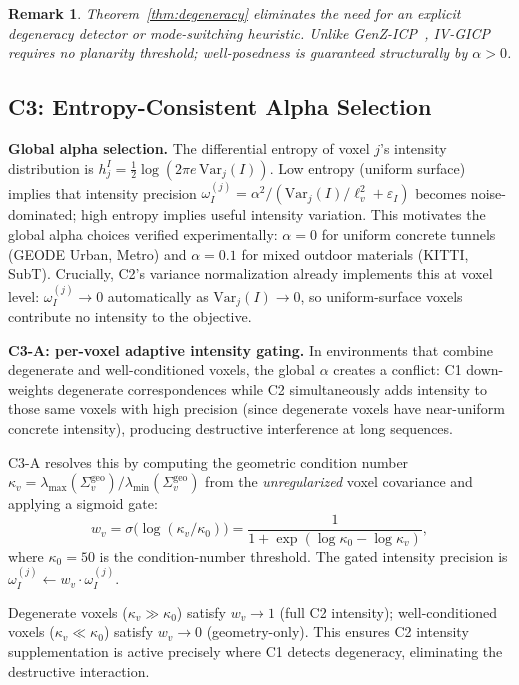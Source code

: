 \documentclass[letterpaper, 10pt, conference]{ieeeconf}
\newtheorem{remark}{Remark}
\begin{document}
\begin{remark}
Theorem~\ref{thm:degeneracy} eliminates the need for an explicit degeneracy
detector or mode-switching heuristic.
Unlike GenZ-ICP~\cite{zhang2024genz}, IV-GICP requires no planarity threshold;
well-posedness is guaranteed structurally by $\alpha > 0$.
\end{remark}

\subsection{C3: Entropy-Consistent Alpha Selection}\label{sec:c3}

\textbf{Global alpha selection.}
The differential entropy of voxel $j$'s intensity distribution is
$h_j^I = \frac{1}{2}\log(2\pi e\,\mathrm{Var}_j(I))$.
Low entropy (uniform surface) implies that intensity precision
$\omega_I^{(j)} = \alpha^2/(\mathrm{Var}_j(I)/\ell_v^2 + \varepsilon_I)$ becomes
noise-dominated; high entropy implies useful intensity variation.
This motivates the global alpha choices verified experimentally:
$\alpha = 0$ for uniform concrete tunnels (GEODE Urban, Metro) and $\alpha = 0.1$
for mixed outdoor materials (KITTI, SubT).
Crucially, C2's variance normalization already implements this at voxel level:
$\omega_I^{(j)} \to 0$ automatically as $\mathrm{Var}_j(I) \to 0$,
so uniform-surface voxels contribute no intensity to the objective.

\textbf{C3-A: per-voxel adaptive intensity gating.}
In environments that combine degenerate and well-conditioned voxels, the
global $\alpha$ creates a conflict: C1 down-weights degenerate correspondences
while C2 simultaneously adds intensity to those same voxels with high precision
(since degenerate voxels have near-uniform concrete intensity), producing
destructive interference at long sequences.

C3-A resolves this by computing the geometric condition number
$\kappa_v = \lambda_{\max}(\Sigma_v^{\mathrm{geo}}) / \lambda_{\min}(\Sigma_v^{\mathrm{geo}})$
from the \emph{unregularized} voxel covariance and applying a sigmoid gate:
\begin{equation}
  w_v = \sigma\!\bigl(\log(\kappa_v/\kappa_0)\bigr)
       = \frac{1}{1 + \exp(\log\kappa_0 - \log\kappa_v)},
  \label{eq:c3a_gate}
\end{equation}
where $\kappa_0 = 50$ is the condition-number threshold.
The gated intensity precision is $\omega_I^{(j)} \leftarrow w_v \cdot \omega_I^{(j)}$.

Degenerate voxels ($\kappa_v \gg \kappa_0$) satisfy $w_v \to 1$ (full C2 intensity);
well-conditioned voxels ($\kappa_v \ll \kappa_0$) satisfy $w_v \to 0$ (geometry-only).
This ensures C2 intensity supplementation is active precisely where C1 detects
degeneracy, eliminating the destructive interaction.
\end{document}
